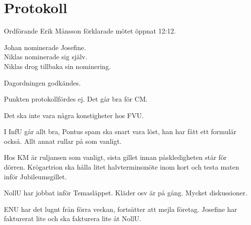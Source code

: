 \documentclass[10pt]{article}
\def\mo{Erik Månsson}
\begin{document}
\section*{Protokoll}
\begin{paragrafer}
Ordförande {\mo} förklarade mötet öppnat 12:12.

{\valavmo}

{\valavms}

Johan nominerade Josefine.\\
Niklas nominerade sig själv.\\
Niklas drog tillbaka sin nominering.\\
{\valavj}
{\tosg}

{\ingaadj}


Dagordningen godkändes.


\begin{fyllnadsval} %
\end{fyllnadsval}
\newpage
{}
\begin{paragrafer}
Punkten protokollfördes ej.
Det går bra för CM.

Det ska inte vara några konstigheter hos FVU.

I InfU går allt bra, Pontus spam ska snart vara löst, han har fått ett formulär också. Allt annat rullar på som vanligt.

Hos KM är ruljansen som vanligt, sista gillet innan påskledigheten står för dörren. Krögartrion ska hålla litet halvterminsmöte inom kort och testa maten inför Jubileumsgillet.

NollU har jobbat inför Temasläppet. Kläder osv är på gång. Mycket diskussioner.

ENU har det lugnt från förra veckan, fortsätter att mejla företag. Josefine har fakturerat lite och ska fakturera lite åt NollU.


\end{paragrafer}
\end{paragrafer}
\end{document}

